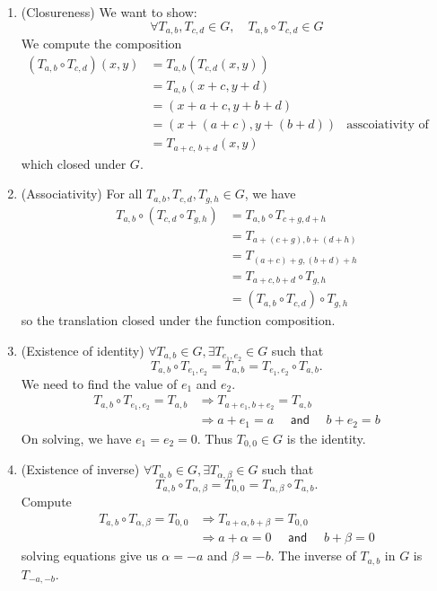 \begin{solution}
    \begin{enumerate}
        \item (Closureness) We want to show:
            \[
                \forall T_{a,b}, T_{c,d} \in G, \quad T_{a,b} \circ T_{c,d} \in G
            \]
        We compute the composition 
        \begin{align*}
            (T_{a,b} \circ T_{c,d})(x,y) &= T_{a,b}(T_{c,d}(x,y))\\
            &= T_{a,b}(x+c, y+d)\\
            &= (x+a+c,y+b+d)\\
            &= (x+(a+c), y+(b+d)) & \text{asscoiativity of ordinary addition}\\
            &= T_{a+c,\, b+d}(x,y)
        \end{align*}
        which closed under $G$.

        \item (Associativity) For all $T_{a,b}, T_{c,d}, T_{g,h} \in G$, we have 
        \begin{align*}
            T_{a,b} \circ (T_{c,d} \circ T_{g,h}) &= T_{a,b} \circ T_{c+g, d+h}\\
            &= T_{a+(c+g), b+(d+h)}\\
            &= T_{(a+c)+g, (b+d)+h}\\
            &= T_{a+c, b+d} \circ T_{g,h}\\
            &= (T_{a,b} \circ T_{c,d}) \circ T_{g,h}
        \end{align*}
        so the translation closed under the function composition.

        \item (Existence of identity) $\forall T_{a,b} \in G, \exists T_{e_1, e_2} \in G$ such that 
        \[
            T_{a,b} \circ T_{e_1, e_2} = T_{a,b} = T_{e_1, e_2} \circ T_{a,b}.
        \]
        We need to find the value of $e_1$ and $e_2$. 
        \begin{align*}
            T_{a,b} \circ T_{e_1, e_2} = T_{a,b} &\Rightarrow T_{a+e_1, b+e_2} = T_{a,b}\\
            &\Rightarrow a + e_1 = a \quad \textsf{ and } \quad b + e_2 = b
        \end{align*}
        On solving, we have $e_1 = e_2 = 0$. Thus $T_{0,0} \in G$ is the identity.

        \item (Existence of inverse) $\forall T_{a,b} \in G, \exists T_{\alpha, \beta} \in G$ such that 
        \[
            T_{a,b} \circ T_{\alpha, \beta} = T_{0,0} = T_{\alpha, \beta} \circ T_{a,b}. 
        \]
        Compute 
        \begin{align*}
            T_{a,b} \circ T_{\alpha, \beta} = T_{0,0} &\Rightarrow T_{a + \alpha, b + \beta} = T_{0,0}\\
            &\Rightarrow a + \alpha = 0 \quad \textsf{ and } \quad b + \beta = 0
        \end{align*}
        solving equations give us $\alpha = - a$ and $\beta = -b$. The inverse of $T_{a,b}$ in $G$ is $T_{-a, -b}$.
    \end{enumerate}
\end{solution}

